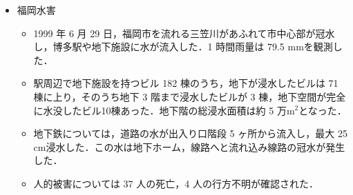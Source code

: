 \documentclass[a4paper,12pt,fleqn]{jarticle}
\begin{document}
\begin{itemize}



\item 福岡水害\cite{福岡水害国土交通省}
  \begin{itemize}
  \item 1999 年 6 月 29 日，福岡市を流れる三笠川があふれて市中心部が冠水し，博多駅や地下施設に水が流入した．1 時間雨量は 79.5 mmを観測した．
  \item 駅周辺で地下施設を持つビル 182 棟のうち，地下が浸水したビルは 71 棟に上り，そのうち地下 3 階まで浸水したビルが 3 棟，地下空間が完全に水没したビル10棟あった．地下階の総浸水面積は約 5 万m$^2$となった．
  \item 地下鉄については，道路の水が出入り口階段 5 ヶ所から流入し，最大 25 cm浸水した．この水は地下ホーム，線路へと流れ込み線路の冠水が発生した．
  \item 人的被害については 37 人の死亡，4 人の行方不明が確認された．
  \end{itemize}
\end{itemize}
\end{document}
